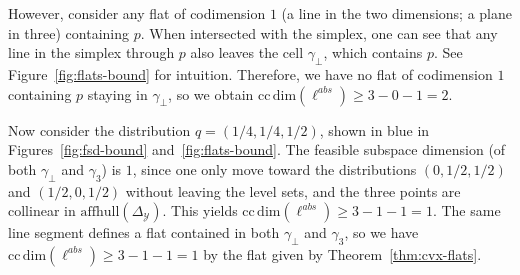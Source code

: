 \documentclass{article}
\newcommand{\simplex}{\Delta_\Y}
\newcommand{\ccdim}{\mathrm{cc\,dim}}
\newcommand{\affhull}{\mathrm{affhull}}
\newcommand{\Y}{\mathcal{Y}}
\begin{document}
However, consider any flat of codimension $1$ (a line in the two dimensions; a plane in three) containing $p$.
When intersected with the simplex, one can see that any line in the simplex through $p$ also leaves the cell $\gamma_\bot$, which contains $p$.
See Figure~\ref{fig:flats-bound} for intuition.
Therefore, we have no flat of codimension $1$ containing $p$ staying in $\gamma_\bot$, so we obtain $\ccdim(\ell^{abs}) \geq 3 - 0 - 1 = 2$.

Now consider the distribution $q = (1/4, 1/4, 1/2)$, shown in blue in Figures~\ref{fig:fsd-bound} and~\ref{fig:flats-bound}.
The feasible subspace dimension (of both $\gamma_\bot$ and $\gamma_3$) is $1$, since one only move toward the distributions $(0,1/2, 1/2)$ and $(1/2, 0, 1/2)$ without leaving the level sets, and the three points are collinear in $\affhull(\simplex)$.  This yields $\ccdim(\ell^{abs}) \geq 3 - 1- 1 = 1$.
The same line segment defines a flat contained in both $\gamma_\bot$ and $\gamma_3$, so we have $\ccdim(\ell^{abs}) \geq 3 - 1 - 1 = 1$ by the flat given by Theorem~\ref{thm:cvx-flats}.
\end{document}
